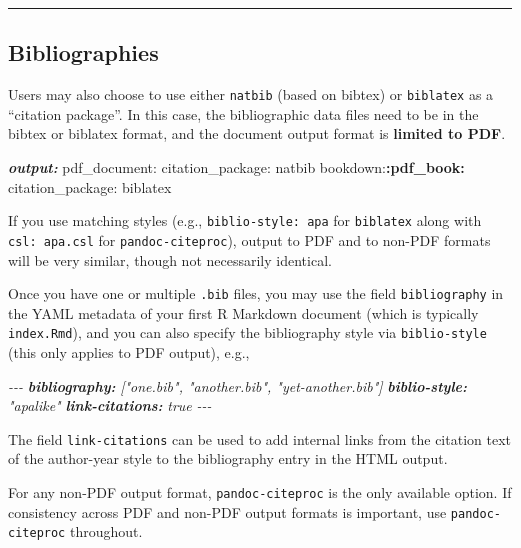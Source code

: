 \documentclass[
]{book}
\newenvironment{Shaded}{\begin{snugshade}}{\end{snugshade}}
\newcommand{\AnnotationTok}[1]{\textcolor[rgb]{0.56,0.35,0.01}{\textbf{\textit{#1}}}}
\newcommand{\CommentTok}[1]{\textcolor[rgb]{0.56,0.35,0.01}{\textit{#1}}}
\newcommand{\NormalTok}[1]{#1}
\newcommand{\SpecialCharTok}[1]{\textcolor[rgb]{0.81,0.36,0.00}{\textbf{#1}}}
\theoremstyle{definition}
\theoremstyle{definition}
\theoremstyle{definition}
\theoremstyle{definition}
\theoremstyle{remark}
\begin{document}
\begin{center}\rule{0.5\linewidth}{0.5pt}\end{center}

\subsection{Bibliographies}\label{bibliographies}

Users may also choose to use either \texttt{natbib} (based on bibtex) or \texttt{biblatex} as a ``citation package''.
In this case, the bibliographic data files need to be in the bibtex or biblatex format, and the document output format is \textbf{limited to PDF}.

\begin{Shaded}
\begin{Highlighting}[]
\AnnotationTok{output:}
\NormalTok{  pdf\_document:}
\NormalTok{    citation\_package: natbib}
\NormalTok{  bookdown:}\SpecialCharTok{:pdf\_book:}
\NormalTok{    citation\_package: biblatex}
\end{Highlighting}
\end{Shaded}

If you use matching styles (e.g., \texttt{biblio-style:\ apa} for \texttt{biblatex} along with \texttt{csl:\ apa.csl} for \texttt{pandoc-citeproc}), output to PDF and to non-PDF formats will be very similar, though not necessarily identical.

Once you have one or multiple \texttt{.bib} files, you may use the field \texttt{bibliography} in the YAML metadata of your first R Markdown document (which is typically \texttt{index.Rmd}), and you can also specify the bibliography style via \texttt{biblio-style} (this only applies to PDF output), e.g.,

\begin{Shaded}
\begin{Highlighting}[]
\CommentTok{{-}{-}{-}}
\AnnotationTok{bibliography:}\CommentTok{ ["one.bib", "another.bib", "yet{-}another.bib"]}
\AnnotationTok{biblio{-}style:}\CommentTok{ "apalike"}
\AnnotationTok{link{-}citations:}\CommentTok{ true}
\CommentTok{{-}{-}{-}}
\end{Highlighting}
\end{Shaded}

The field \texttt{link-citations} can be used to add internal links from the citation text of the author-year style to the bibliography entry in the HTML output.

For any non-PDF output format, \texttt{pandoc-citeproc} is the only available option. If consistency across PDF and non-PDF output formats is important, use \texttt{pandoc-citeproc} throughout.
\end{document}
